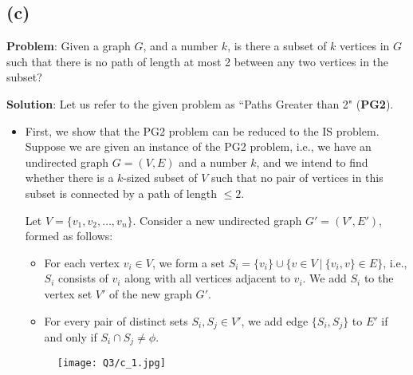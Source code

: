 \documentclass[11pt, fleqn]{article}
\begin{document}
\newpage

\subsection*{(c)}

\textbf{Problem}: Given a graph $G$, and a number $k$, is there a subset of $k$ vertices in $G$ such that there is no path of length at most 2 between any two vertices in the subset?

\bigskip

\textbf{Solution}: Let us refer to the given problem as ``Paths Greater than 2" (\textbf{PG2}).

\begin{itemize}
    \item
    First, we show that the PG2 problem can be reduced to the IS problem. Suppose we are given an instance of the PG2 problem, i.e., we have an undirected graph $G = (V, E)$ and a number $k$, and we intend to find whether there is a $k$-sized subset of $V$ such that no pair of vertices in this subset is connected by a path of length $\leq 2$.
    
    Let $V = \{v_1, v_2, \dots, v_n\}$. Consider a new undirected graph $G'=(V',E')$, formed as follows:
    \begin{itemize}
        \item For each vertex $v_i \in V$, we form a set $S_i = \{v_i\} \cup \{v \in V \ | \ \{v_i, v\} \in E\}$, i.e., $S_i$ consists of $v_i$ along with all vertices adjacent to $v_i$. We add $S_i$ to the vertex set $V'$ of the new graph $G'$.
        \item For every pair of distinct sets $S_i, S_j \in V'$, we add edge $\{S_i, S_j\}$ to $E'$ if and only if $S_i \cap S_j \neq \phi$.
    \end{itemize}
    \begin{figure}[H]
        \texttt{[image: Q3/c\_1.jpg]}
    \end{figure}
    

\end{itemize}
\end{document}
